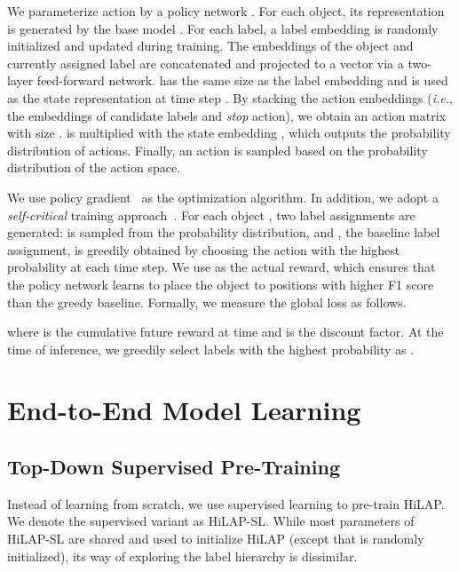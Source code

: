 \documentclass[11pt,a4paper]{article}
\newcommand{\start}[1]{\vspace{1.8mm}\noindent{{\bf #1}}}
\newcommand{\ie}{\textit{i.e.}} \newcommand{\eg}{\textit{e.g.}}
\begin{document}
\start{States and Policy Network.}
We parameterize action  by a policy network .
For each object, its representation  is generated by the base model .
For each label, a label embedding  is randomly initialized and updated during training.
The embeddings of the object  and currently assigned label  are concatenated and projected to a vector  via a two-layer feed-forward network.
 has the same size as the label embedding  and is used as the state representation at time step .
By stacking the action embeddings (\ie, the embeddings of candidate labels and \textit{stop} action), we obtain an action matrix  with size .
 is multiplied with the state embedding , which outputs the probability distribution of actions.
Finally, an action  is sampled based on the probability distribution of the action space.
\vspace*{-.25cm}

We use policy gradient~\citep{williams1992simple} as the optimization algorithm.
In addition, we adopt a \textit{self-critical} training approach~\citep{rennie2017self}. For each object , two label assignments are generated:  is sampled from the probability distribution, and , the baseline label assignment, is greedily obtained by choosing the action with the highest probability at each time step.
We use  as the actual reward, which ensures that the policy network learns to place the object to positions with higher F1 score than the greedy baseline.
Formally, we measure the global loss  as follows.
\vspace*{-.25cm}

where  is the cumulative future reward at time  and  is the discount factor.
At the time of inference, we greedily select labels with the highest probability as  .  

\section{End-to-End Model Learning}
\subsection{Top-Down Supervised Pre-Training}
\label{subsec_tdsp}

Instead of learning from scratch, we use supervised learning to pre-train HiLAP.
We denote the supervised variant as HiLAP-SL.
While most parameters of HiLAP-SL are shared and used to initialize HiLAP (except that  is randomly initialized), its way of exploring the label hierarchy  is dissimilar.
\end{document}
